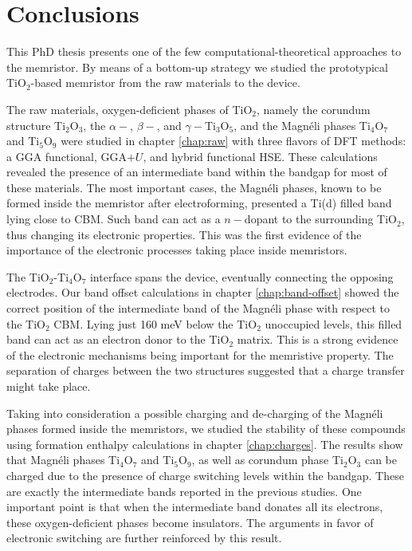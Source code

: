 \chapter{Conclusions}
\label{chap:concludions}

This PhD thesis presents one of the few computational-theoretical approaches to the memristor. By means of a bottom-up strategy we studied the prototypical TiO$_2$-based memristor from the raw materials to the device.

 The raw materials, oxygen-deficient phases of TiO$_2$, namely the corundum structure Ti$_2$O$_3$, the $\alpha-$, $\beta-$, and $\gamma-$Ti$_3$O$_5$, and the Magnéli phases Ti$_4$O$_7$ and Ti$_5$O$_9$ were studied in chapter \ref{chap:raw} with three flavors of DFT methods: a GGA functional, GGA$+U$, and hybrid functional HSE. These calculations revealed the presence of an intermediate band within the bandgap for most of these materials. The most important cases, the Magnéli phases, known to be formed inside the memristor after electroforming, presented a Ti(d) filled band lying close to CBM. Such band can act as a $n-$dopant to the surrounding TiO$_2$, thus changing its electronic properties. This was the first evidence of the importance of the electronic processes taking place inside memristors.

 The TiO$_2$-Ti$_4$O$_7$ interface spans the device, eventually connecting the opposing electrodes. Our band offset calculations in chapter \ref{chap:band-offset} showed the correct position of the intermediate band of the Magnéli phase with respect to the TiO$_2$ CBM. Lying just 160 meV below the TiO$_2$ unoccupied levels, this filled band can act as an electron donor to the TiO$_2$ matrix. This is a strong evidence of the electronic mechanisms being important for the memristive property. The separation of charges between the two structures suggested that a charge transfer might take place.

 Taking into consideration a possible charging and de-charging of the Magnéli phases formed inside the memristors, we studied the stability of these compounds using formation enthalpy calculations in chapter \ref{chap:charges}. The results show that Magnéli phases Ti$_4$O$_7$ and Ti$_5$O$_9$, as well as corundum phase Ti$_2$O$_3$ can be charged due to the presence of charge switching levels within the bandgap. These are exactly the intermediate bands reported in the previous studies. One important point is that when the intermediate band donates all its electrons, these oxygen-deficient phases become insulators. The arguments in favor of electronic switching are further reinforced by this result.


